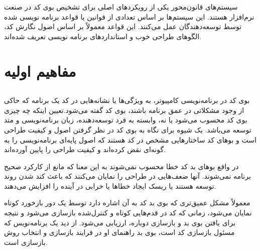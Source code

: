 سیستم‌های قانون‌محور یکی از رویکردهای اصلی برای تشخیص بوی کد در صنعت نرم‌افزار هستند. این سیستم‌ها بر اساس تعدادی از قوانین یا قواعد برنامه نویسی شده توسط توسعه‌دهندگان عمل می‌کنند. این قواعد معمولاً بر اساس اصول نگارش کد، الگوهای طراحی خوب و استانداردهای برنامه نویسی تعریف شده‌اند.
\section[مفاهیم اولیه]{مفاهیم اولیه}
\subsection {}
بوی کد در برنامه‌نویسی کامپیوتر، به ویژگی‌ها یا نشانه‌هایی در کد یک برنامه که حاکی از وجود مشکلاتی در عمق برنامه باشند، بوی کد گفته می‌شود.تعیین اینکه چه چیزی بوی کد محسوب می‌شود یا نه، وابسته به فرد توسعه‌دهنده، زبان برنامه‌نویسی و متد توسعه می‌باشد.
یک شیوه برای نگاه به بوی کد در نظر گرفتن اصول و کیفیت طراحی است و بوهای کد ساختارهایی مشخص در کد هستند که اصول پایه‌ای برنامه‌نویسی را به گونه‌ای نقض کرده‌اند و کیفیت طراحی را پایین آورده‌اند.

در واقع بوهای بد کد خطا محسوب نمی‌شوند به این معنا که مانع از کارکرد صحیح برنامه نمی‌شوند. آنها ضعف‌هایی در طراحی را نمایان می‌کنند که باعث کند شدن روند توسعه هستند یا ریسک ایجاد خطاها یا خرابی در آینده را افزایش می‌دهند.

معمولاً مشکل عمیق‌تری که بوی بد کد به آن اشاره دارد توسط یک دور بازخورد کوتاه نمایان می‌شود، زمانی که کد در قدم‌هایی کوتاه و کنترل‌شده بازسازی می‌شود و نتیجه برای یافتن بوی بد و بازسازی دوباره، ارزیابی می‌شود. از دید یک برنامه‌نویس که مسئول بازسازی کد است، بوی بد راهنمای او در فرایند بازسازی و انتخاب روش بازسازی است.\cite{whatiscodesmell}
